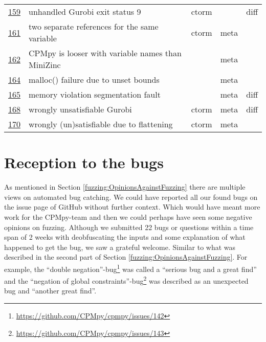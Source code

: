 \begin{table}[]
\begin{tabular}{lllll}
		\href{https://github.com/CPMpy/cpmpy/issues/159}{159} & unhandled Gurobi exit status 9                    & ctorm &       & diff \\
		\href{https://github.com/CPMpy/cpmpy/issues/161}{161} & two separate references for the same variable     & ctorm & meta  &      \\
		\href{https://github.com/CPMpy/cpmpy/issues/162}{162} & CPMpy is looser with variable names than MiniZinc &       & meta  &      \\
		\href{https://github.com/CPMpy/cpmpy/issues/164}{164} & malloc() failure due to unset bounds              &       & meta  &      \\
		\href{https://github.com/CPMpy/cpmpy/issues/165}{165} & memory violation segmentation fault               &       & meta  & diff \\
		\href{https://github.com/CPMpy/cpmpy/issues/168}{168} & wrongly unsatisfiable Gurobi                      & ctorm & meta  & diff \\
		\href{https://github.com/CPMpy/cpmpy/issues/170}{170} & wrongly (un)satisfiable due to flattening         & ctorm & meta  &      \\ \bottomrule
	\end{tabular}
\end{table}


\section{Reception to the bugs} 
\label{res:ReceptionToBug}
As mentioned in Section \ref{fuzzing:OpinionsAgainstFuzzing} there are multiple views on automated bug catching. We could have reported all our found bugs on the issue page of GitHub without further context. Which would have meant more work for the CPMpy-team and then we could perhaps have seen some negative opinions on fuzzing. 
Although we submitted 22 bugs or questions within a time span of 2 weeks with deobfuscating the inputs and some explanation of what happened to get the bug, we saw a grateful welcome. Similar to what was described in the second part of Section \ref{fuzzing:OpinionsAgainstFuzzing}. 
For example, the “double negation”-bug\footnote{\url{https://github.com/CPMpy/cpmpy/issues/142}} was called a “serious bug and a great find” and 
the “negation of global constraints”-bug\footnote{\url{https://github.com/CPMpy/cpmpy/issues/143}} was described as an unexpected bug and “another great find”.

